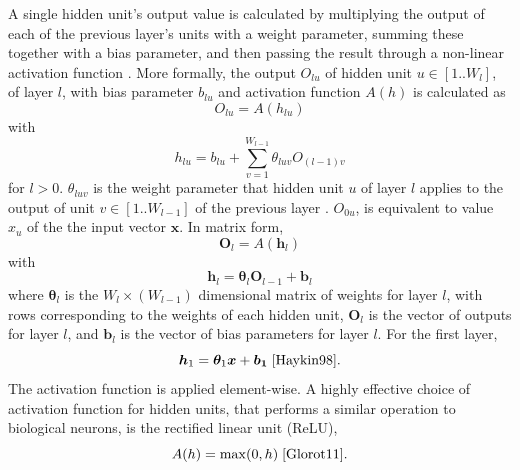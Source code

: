 \documentclass[12pt]{article}
\begin{document}
A single hidden unit's output value is calculated by multiplying the output of each of the previous layer's units with a weight parameter, summing these together with a bias parameter, and then passing the result through a non-linear activation function \cite{Rumelhart86}. More formally, the output $O_{lu}$ of hidden unit $u\in[1..W_l]$, of layer $l$, with bias parameter $b_{lu}$ and activation function $A(h)$ is calculated as
\begin{equation}
O_{lu}=A(h_{lu})
\end{equation}
with
\begin{equation}
h_{lu}=b_{lu}+\sum_{v=1}^{W_{l-1}}\theta_{luv}O_{(l-1)v}
\end{equation}
for $l > 0$. $\theta_{luv}$ is the weight parameter that hidden unit $u$ of layer $l$ applies to the output of unit $v\in[1..W_{l-1}]$ of the previous layer \cite{Haykin98}. $O_{0u}$, is equivalent to value $x_u$ of the the input vector $\bm{x}$. In matrix form,
\begin{equation}
\bm{O}_l=A(\bm{h}_l)
\end{equation}
with
\begin{equation}
\bm{h}_l=\boldsymbol\theta_l\bm{O}_{l-1}+\bm{b}_l
\end{equation}
where $\boldsymbol\theta_l$ is the $W_l \times \left(W_{l-1}\right)$ dimensional matrix of weights for layer $l$, with rows corresponding to the weights of each hidden unit, $\bm{O}_l$ is the vector of outputs for layer $l$, and $\bm{b}_l$ is the vector of bias parameters for layer $l$. For the first layer,
\begin{equation}
\bm{h}_1=\boldsymbol\theta_1\bm{x}+\bm{b_1}\; \cite{Haykin98}.
\end{equation}
The activation function is applied element-wise. A highly effective choice of activation function for hidden units, that performs a similar operation to biological neurons, is the rectified linear unit (ReLU),
\begin{equation}
A(h)=\mathrm{max}(0,h)\; \cite{Glorot11}.
\end{equation}
\end{document}
